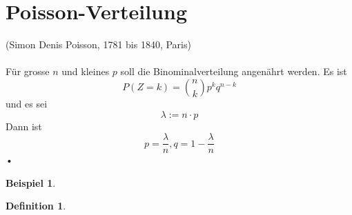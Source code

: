 \documentclass{report}
\newtheorem{mydef}{Definition}
\newtheorem{myexample}{Beispiel}
\begin{document}
\section{Poisson-Verteilung}
(Simon Denis Poisson, 1781 bis 1840, Paris)\\\\
Für grosse $n$ und kleines $p$ soll die Binominalverteilung angenährt werden. Es ist
\begin{equation}
P(Z=k) = \binom{n}{k} p^k q^{n-k}
\end{equation}
und es sei
\begin{equation}
\lambda := n \cdot p
\end{equation}
Dann ist
\begin{equation}
p = \frac{\lambda}{n}, q = 1 - \frac{\lambda}{n}
\end{equation}•

\begin{myexample}
\end{myexample}
\begin{mydef}
\end{mydef}
\end{document}
